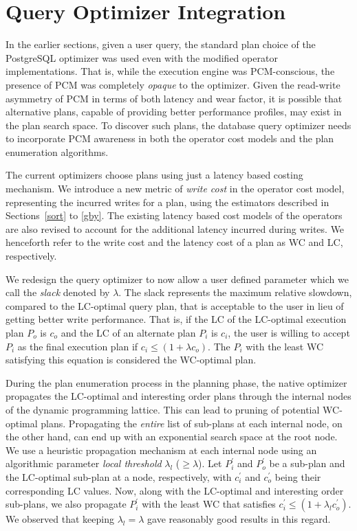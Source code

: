 \section{Query Optimizer Integration}
\label{discussion}

In the earlier sections, given a user query, the standard plan choice
of the PostgreSQL optimizer was used even with the modified operator
implementations. That is, while the execution engine was PCM-conscious,
the presence of PCM was completely \emph{opaque} to the optimizer.
Given the read-write asymmetry of PCM in terms of both latency and wear
factor, it is possible that alternative plans, capable of providing better
performance profiles, may exist in the plan search space. To discover
such plans, the database query optimizer needs to incorporate PCM
awareness in both the operator cost models and the plan enumeration
algorithms.

The current optimizers choose plans using just a latency based costing mechanism. We introduce a new metric of \emph{write cost} in the operator cost model, representing the incurred writes for a plan, using the estimators described in Sections~\ref{sort} to \ref{gby}. The existing latency based cost models of the operators are also revised to account for the additional latency incurred during writes. We henceforth refer to the write cost and the latency cost of a plan as WC and LC, respectively. 

We redesign the query optimizer to now allow a user defined parameter which we call the \emph{slack} denoted by $\lambda$. The slack represents the maximum relative slowdown, compared to the LC-optimal query plan, that is acceptable to the user in lieu of getting better write performance. That is, if the LC of the LC-optimal execution plan $P_o$ is $c_o$ and the LC of an alternate plan $P_i$ is $c_i$, the user is willing to accept $P_i$ as the final execution plan if $c_i \le (1+\lambda c_o)$. The $P_i$ with the least WC satisfying this equation is considered the WC-optimal plan.

During the plan enumeration process in the planning phase, the native optimizer propagates the LC-optimal and interesting order plans through the internal nodes of the dynamic programming lattice. This can lead to pruning of potential WC-optimal plans. Propagating the \emph{entire} list of sub-plans at each internal node, on the other hand, can end up with an exponential search space at the root node. We use a heuristic propagation mechanism at each internal node using an algorithmic parameter \emph{local threshold} $\lambda_l$ ($\ge\lambda$). Let  $P_i^'$ and $P_o^'$ be a sub-plan and the LC-optimal sub-plan at a node, respectively, with $c_i^'$ and $c_o^'$ being their corresponding LC values. Now, along with the LC-optimal and interesting order sub-plans, we also propagate $P_i^'$ with the least WC that satisfies $c_i^{'} \le (1+\lambda_l c_o^{'})$. We observed that keeping $\lambda_l = \lambda$ gave reasonably good results in this regard.

